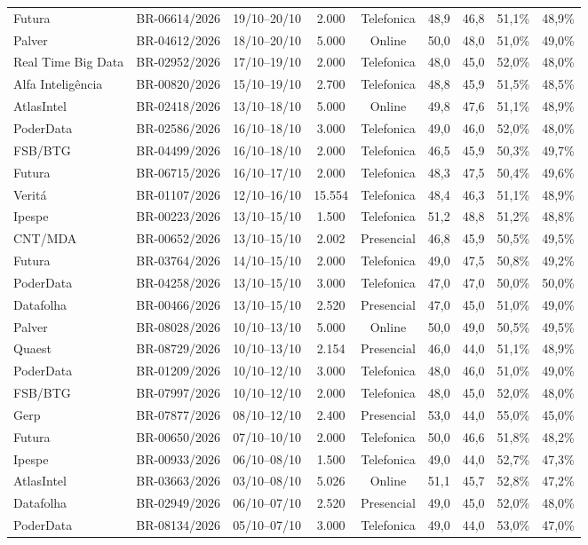 \begin{longtable}{llccccccc}
Futura & BR-06614/2026 & 19/10--20/10 & 2.000 & Telefonica & 48,9 & 46,8 & 51,1\% & 48,9\% \\
Palver & BR-04612/2026 & 18/10--20/10 & 5.000 & Online & 50,0 & 48,0 & 51,0\% & 49,0\% \\
Real Time Big Data & BR-02952/2026 & 17/10--19/10 & 2.000 & Telefonica & 48,0 & 45,0 & 52,0\% & 48,0\% \\
Alfa Inteligência & BR-00820/2026 & 15/10--19/10 & 2.700 & Telefonica & 48,8 & 45,9 & 51,5\% & 48,5\% \\
AtlasIntel & BR-02418/2026 & 13/10--18/10 & 5.000 & Online & 49,8 & 47,6 & 51,1\% & 48,9\% \\
PoderData & BR-02586/2026 & 16/10--18/10 & 3.000 & Telefonica & 49,0 & 46,0 & 52,0\% & 48,0\% \\
FSB/BTG & BR-04499/2026 & 16/10--18/10 & 2.000 & Telefonica & 46,5 & 45,9 & 50,3\% & 49,7\% \\
Futura & BR-06715/2026 & 16/10--17/10 & 2.000 & Telefonica & 48,3 & 47,5 & 50,4\% & 49,6\% \\
Veritá & BR-01107/2026 & 12/10--16/10 & 15.554 & Telefonica & 48,4 & 46,3 & 51,1\% & 48,9\% \\
Ipespe & BR-00223/2026 & 13/10--15/10 & 1.500 & Telefonica & 51,2 & 48,8 & 51,2\% & 48,8\% \\
CNT/MDA & BR-00652/2026 & 13/10--15/10 & 2.002 & Presencial & 46,8 & 45,9 & 50,5\% & 49,5\% \\
Futura & BR-03764/2026 & 14/10--15/10 & 2.000 & Telefonica & 49,0 & 47,5 & 50,8\% & 49,2\% \\
PoderData & BR-04258/2026 & 13/10--15/10 & 3.000 & Telefonica & 47,0 & 47,0 & 50,0\% & 50,0\% \\
Datafolha & BR-00466/2026 & 13/10--15/10 & 2.520 & Presencial & 47,0 & 45,0 & 51,0\% & 49,0\% \\
Palver & BR-08028/2026 & 10/10--13/10 & 5.000 & Online & 50,0 & 49,0 & 50,5\% & 49,5\% \\
Quaest & BR-08729/2026 & 10/10--13/10 & 2.154 & Presencial & 46,0 & 44,0 & 51,1\% & 48,9\% \\
PoderData & BR-01209/2026 & 10/10--12/10 & 3.000 & Telefonica & 48,0 & 46,0 & 51,0\% & 49,0\% \\
FSB/BTG & BR-07997/2026 & 10/10--12/10 & 2.000 & Telefonica & 48,0 & 45,0 & 52,0\% & 48,0\% \\
Gerp & BR-07877/2026 & 08/10--12/10 & 2.400 & Presencial & 53,0 & 44,0 & 55,0\% & 45,0\% \\
Futura & BR-00650/2026 & 07/10--10/10 & 2.000 & Telefonica & 50,0 & 46,6 & 51,8\% & 48,2\% \\
Ipespe & BR-00933/2026 & 06/10--08/10 & 1.500 & Telefonica & 49,0 & 44,0 & 52,7\% & 47,3\% \\
AtlasIntel & BR-03663/2026 & 03/10--08/10 & 5.026 & Online & 51,1 & 45,7 & 52,8\% & 47,2\% \\
Datafolha & BR-02949/2026 & 06/10--07/10 & 2.520 & Presencial & 49,0 & 45,0 & 52,0\% & 48,0\% \\
PoderData & BR-08134/2026 & 05/10--07/10 & 3.000 & Telefonica & 49,0 & 44,0 & 53,0\% & 47,0\% \\
\end{longtable}
